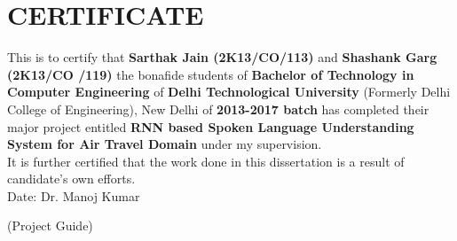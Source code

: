 \chapter*{CERTIFICATE}
\linespread{1.6}


\normalsize This is to certify that \textbf{Sarthak Jain (2K13/CO/113)} and \textbf{Shashank Garg (2K13/CO /119)} the bonafide students of \textbf{Bachelor of Technology in Computer Engineering} of \textbf{Delhi Technological University} (Formerly Delhi College of Engineering), New Delhi of \textbf{2013-2017 batch} has completed their major project entitled \textbf{RNN based Spoken Language Understanding System for Air Travel Domain} under my supervision.
\\
It is further certified that the work done in this dissertation is a result of candidate's own efforts. 
\\
[1.0cm]




Date: 
\hfill
Dr. Manoj Kumar
 
\hfill
(Project Guide)
